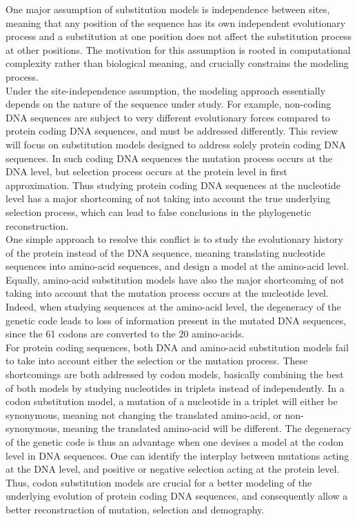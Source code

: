 \documentclass{article}
\begin{document}
One major assumption of substitution models is independence between sites, meaning that any position of the sequence has its own independent evolutionary process and a substitution at one position does not affect the substitution process at other positions.
The motivation for this assumption is rooted in computational complexity rather than biological meaning, and crucially constrains the modeling process.\\

Under the site-independence assumption, the modeling approach essentially depends on the nature of the sequence under study.
For example, non-coding DNA sequences are subject to very different evolutionary forces compared to protein coding DNA sequences, and must be addressed differently.
This review will focus on substitution models designed to address solely protein coding DNA sequences.
In such coding DNA sequences the mutation process occurs at the DNA level, but selection process occurs at the protein level in first approximation.
Thus studying protein coding DNA sequences at the nucleotide level has a major shortcoming of not taking into account the true underlying selection process, which can lead to false conclusions in the phylogenetic reconstruction.\\

One simple approach to resolve this conflict is to study the evolutionary history of the protein instead of the DNA sequence, meaning translating nucleotide sequences into amino-acid sequences, and design a model at the amino-acid level.
Equally, amino-acid substitution models have also the major shortcoming of not taking into account that the mutation process occurs at the nucleotide level.
Indeed, when studying sequences at the amino-acid level, the degeneracy of the genetic code leads to loss of information present in the mutated DNA sequences, since the 61 codons are converted to the 20 amino-acids.\\
 
For protein coding sequences, both DNA and amino-acid substitution models fail to take into account either the selection or the mutation process.
These shortcomings are both addressed by codon models, basically combining the best of both models by studying nucleotides in triplets instead of independently.
In a codon substitution model, a mutation of a nucleotide in a triplet will either be synonymous, meaning not changing the translated amino-acid, or non-synonymous, meaning the translated amino-acid will be different.
The degeneracy of the genetic code is thus an advantage when one devises a model at the codon level in DNA sequences.
One can identify the interplay between mutations acting at the DNA level, and positive or negative selection acting at the protein level.
Thus, codon substitution models are crucial for a better modeling of the underlying evolution of protein coding DNA sequences, and consequently allow a better reconstruction of mutation, selection and demography.
\end{document}
